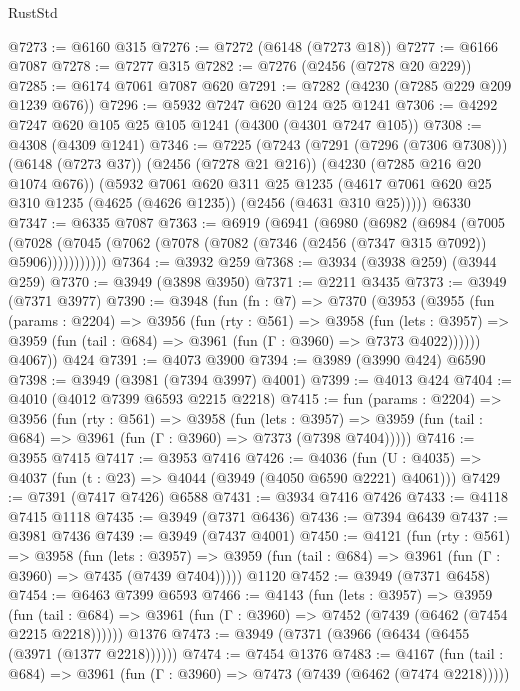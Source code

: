 \begin{lexlean}{RustStd}
\begin{coremodule}
@7273 := @6160 @315
@7276 := @7272 (@6148 (@7273 @18))
@7277 := @6166 @7087
@7278 := @7277 @315
@7282 := @7276 (@2456 (@7278 @20 @229))
@7285 := @6174 @7061 @7087 @620
@7291 := @7282 (@4230 (@7285 @229 @209 @1239 @676))
@7296 := @5932 @7247 @620 @124 @25 @1241
@7306 := @4292 @7247 @620 @105 @25 @105 @1241 (@4300 (@4301 @7247 @105))
@7308 := @4308 (@4309 @1241)
@7346 := @7225
    (@7243
      (@7291 (@7296 (@7306 @7308)))
      (@6148 (@7273 @37))
      (@2456 (@7278 @21 @216))
      (@4230 (@7285 @216 @20 @1074 @676))
      (@5932
        @7061
        @620
        @311
        @25
        @1235
        (@4617 @7061 @620 @25 @310 @1235 (@4625 (@4626 @1235)) (@2456 (@4631 @310 @25)))))
    @6330
@7347 := @6335 @7087
@7363 := @6919
    (@6941
      (@6980
        (@6982
          (@6984
            (@7005
              (@7028 (@7045 (@7062 (@7078 (@7082 (@7346 (@2456 (@7347 @315 @7092)) @5906)))))))))))
@7364 := @3932 @259
@7368 := @3934 (@3938 @259) (@3944 @259)
@7370 := @3949 (@3898 @3950)
@7371 := @2211 @3435
@7373 := @3949 (@7371 @3977)
@7390 := @3948
    (fun (fn : @7) =>
    @7370
      (@3953
        (@3955
          (fun (params : @2204) =>
          @3956
            (fun (rty : @561) =>
            @3958
              (fun (lets : @3957) =>
              @3959 (fun (tail : @684) => @3961 (fun (Γ : @3960) => @7373 @4022))))))
        @4067))
    @424
@7391 := @4073 @3900
@7394 := @3989 (@3990 @424) @6590
@7398 := @3949 (@3981 (@7394 @3997) @4001)
@7399 := @4013 @424
@7404 := @4010 (@4012 @7399 @6593 @2215 @2218)
@7415 := fun (params : @2204) =>
  @3956
    (fun (rty : @561) =>
    @3958
      (fun (lets : @3957) =>
      @3959 (fun (tail : @684) => @3961 (fun (Γ : @3960) => @7373 (@7398 @7404)))))
@7416 := @3955 @7415
@7417 := @3953 @7416
@7426 := @4036 (fun (U : @4035) => @4037 (fun (t : @23) => @4044 (@3949 (@4050 @6590 @2221) @4061)))
@7429 := @7391 (@7417 @7426) @6588
@7431 := @3934 @7416 @7426
@7433 := @4118 @7415 @1118
@7435 := @3949 (@7371 @6436)
@7436 := @7394 @6439
@7437 := @3981 @7436
@7439 := @3949 (@7437 @4001)
@7450 := @4121
    (fun (rty : @561) =>
    @3958
      (fun (lets : @3957) =>
      @3959 (fun (tail : @684) => @3961 (fun (Γ : @3960) => @7435 (@7439 @7404)))))
    @1120
@7452 := @3949 (@7371 @6458)
@7454 := @6463 @7399 @6593
@7466 := @4143
    (fun (lets : @3957) =>
    @3959
      (fun (tail : @684) => @3961 (fun (Γ : @3960) => @7452 (@7439 (@6462 (@7454 @2215 @2218))))))
    @1376
@7473 := @3949 (@7371 (@3966 (@6434 (@6455 (@3971 (@1377 @2218))))))
@7474 := @7454 @1376
@7483 := @4167
    (fun (tail : @684) => @3961 (fun (Γ : @3960) => @7473 (@7439 (@6462 (@7474 @2218)))))

\end{coremodule}
\end{lexlean}
